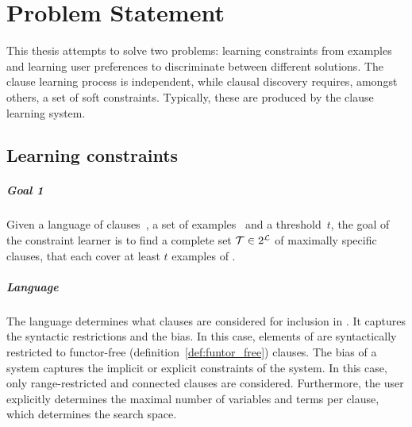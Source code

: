 \chapter{Problem Statement}
\label{cha:problem_statement}




This thesis attempts to solve two problems: learning constraints from examples and learning user preferences to discriminate between different solutions.
The clause learning process is independent, while clausal discovery requires, amongst others, a set of soft constraints.
Typically, these are produced by the clause learning system.

\section{Learning constraints}

\begin{framed}
	\noindent
	\begin{minipage}{\textwidth}
		\paragraph{Goal 1}
		Given a language of clauses~, a set of examples~ and a threshold~$t$, the goal of the constraint learner is to find a complete set $\mathcal{T} \in 2^{\mathcal{L}}$ of maximally specific clauses, that each cover at least $t$ examples of .
	\end{minipage}
\end{framed}

\paragraph{Language}
The language  determines what clauses are considered for inclusion in .
It captures the syntactic restrictions and the bias.
In this case, elements of  are syntactically restricted to functor-free (definition~\ref{def:funtor_free}) clauses.
The bias of a system captures the implicit or explicit constraints of the system.
In this case, only range-restricted and connected clauses are considered.
Furthermore, the user explicitly determines the maximal number of variables and terms per clause, which determines the search space.

